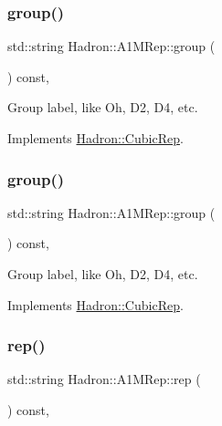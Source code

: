\subsubsection{\texorpdfstring{group()}{group()}\hspace{0.1cm}{\footnotesize\ttfamily [2/3]}}
{\footnotesize\ttfamily std\+::string Hadron\+::\+A1\+M\+Rep\+::group (\begin{DoxyParamCaption}{ }\end{DoxyParamCaption}) const\hspace{0.3cm}{\ttfamily [inline]}, {\ttfamily [virtual]}}

Group label, like Oh, D2, D4, etc. 

Implements \mbox{\hyperlink{structHadron_1_1CubicRep_a0748f11ec87f387062c8e8981339a29c}{Hadron\+::\+Cubic\+Rep}}.

\mbox{\label{structHadron_1_1A1MRep_ad0776ade0fd54254ee8d0e3ba00b1f33}} 
\subsubsection{\texorpdfstring{group()}{group()}\hspace{0.1cm}{\footnotesize\ttfamily [3/3]}}
{\footnotesize\ttfamily std\+::string Hadron\+::\+A1\+M\+Rep\+::group (\begin{DoxyParamCaption}{ }\end{DoxyParamCaption}) const\hspace{0.3cm}{\ttfamily [inline]}, {\ttfamily [virtual]}}

Group label, like Oh, D2, D4, etc. 

Implements \mbox{\hyperlink{structHadron_1_1CubicRep_a0748f11ec87f387062c8e8981339a29c}{Hadron\+::\+Cubic\+Rep}}.

\mbox{\label{structHadron_1_1A1MRep_ace32cdcf9819db0556ec88464d828e6f}} 
\subsubsection{\texorpdfstring{rep()}{rep()}\hspace{0.1cm}{\footnotesize\ttfamily [1/3]}}
{\footnotesize\ttfamily std\+::string Hadron\+::\+A1\+M\+Rep\+::rep (\begin{DoxyParamCaption}{ }\end{DoxyParamCaption}) const\hspace{0.3cm}{\ttfamily [inline]}, {\ttfamily [virtual]}}

